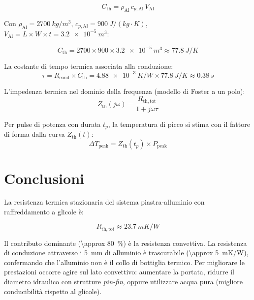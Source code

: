 \documentclass[a4paper,11pt]{article}
\begin{document}
\begin{equation}
  C_{\mathrm{th}} = \rho_{\mathrm{Al}}\,c_{p,\mathrm{Al}}\,V_{\mathrm{Al}}
\end{equation}

Con $\rho_{\mathrm{Al}} = \SI{2700}{kg/m^3}$, $c_{p,\mathrm{Al}} = \SI{900}{J/(kg\cdot K)}$,
$V_{\mathrm{Al}} = L\times W\times t = \SI{3.2e-5}{m^3}$:

\begin{equation}
  C_{\mathrm{th}} = 2700 \times 900 \times \SI{3.2e-5}{m^3}
                  \approx \SI{77.8}{J/K}
\end{equation}

La costante di tempo termica associata alla conduzione:
\begin{equation}
  \tau = R_{\mathrm{cond}}\times C_{\mathrm{th}}
       = \SI{4.88e-3}{K/W} \times \SI{77.8}{J/K}
       \approx \SI{0.38}{s}
\end{equation}

L'impedenza termica nel dominio della frequenza (modello di Foster a un polo):
\begin{equation}
  Z_{\mathrm{th}}(j\omega) = \frac{R_{\mathrm{th,tot}}}{1 + j\omega\tau}
\end{equation}

Per pulse di potenza con durata $t_p$, la temperatura di picco si stima con
il fattore di forma dalla curva $Z_{\mathrm{th}}(t)$:
\begin{equation}
  \Delta T_{\mathrm{peak}} = Z_{\mathrm{th}}(t_p)\times P_{\mathrm{peak}}
\end{equation}

\section{Conclusioni}

La resistenza termica stazionaria del sistema piastra-alluminio con raffreddamento
a glicole è:

\begin{equation}
  R_{\mathrm{th,tot}} \approx \SI{23.7}{mK/W}
\end{equation}

Il contributo dominante (\SI{\approx 80}{\percent}) è la resistenza convettiva.
La resistenza di conduzione attraverso i \SI{5}{mm} di alluminio è trascurabile
(\SI{\approx 5}{mK/W}), confermando che l'alluminio non è il collo di bottiglia
termico. Per migliorare le prestazioni occorre agire sul lato convettivo:
aumentare la portata, ridurre il diametro idraulico con strutture \textit{pin-fin},
oppure utilizzare acqua pura (migliore conducibilità rispetto al glicole).
\end{document}
